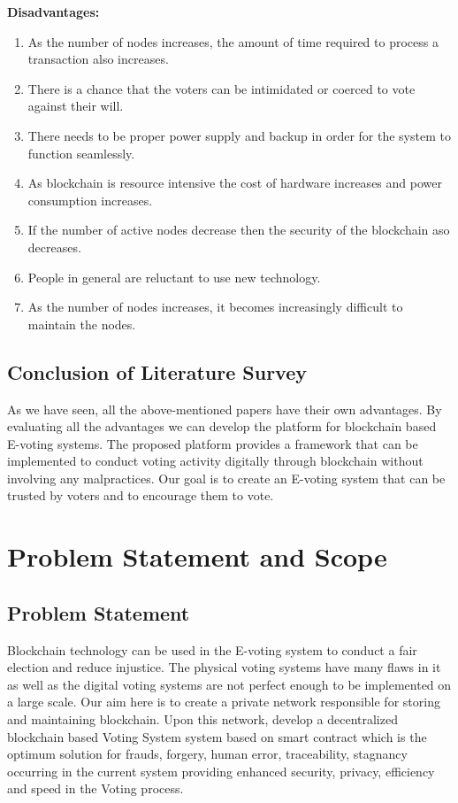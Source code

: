 \documentclass[oneside, 12pt]{book}
\begin{document}
			\textbf{Disadvantages:}
			\begin{enumerate}
				\item As the number of nodes increases, the amount of time required to process a transaction also increases.
				\item There is a chance that the voters can be intimidated or coerced to vote against their will.
				\item There needs to be proper power supply and backup in order for the system to function seamlessly.
				\item As blockchain is resource intensive the cost of hardware increases and power consumption increases.
				\item If the number of active nodes decrease then the security of the blockchain aso decreases.
				\item People in general are reluctant to use new technology.
				\item As the number of nodes increases, it becomes increasingly difficult to maintain the nodes.
			\end{enumerate}
		\subsection{Conclusion of Literature Survey}
			As we have seen, all the above-mentioned papers have their own advantages. By evaluating all the advantages we can develop the platform for blockchain based E-voting systems. The proposed platform provides a framework that can be implemented to conduct voting activity digitally through blockchain without involving any malpractices. Our goal is to create an E-voting system that can be trusted by voters and to encourage them to vote.
	\newpage
	\section{Problem Statement and Scope}
	\newpage
		\subsection{Problem Statement}
			Blockchain technology can be used in the E-voting system to conduct a fair election and reduce injustice. The physical voting systems have many flaws in it as well as the digital voting systems are not perfect enough to be implemented on a large scale. Our aim here is to create a private network responsible for storing and maintaining blockchain. Upon this network, develop a decentralized blockchain based Voting System system based on smart contract which is the optimum solution for frauds, forgery, human error, traceability, stagnancy occurring in the current system providing enhanced security, privacy, efficiency and speed in the Voting  process.
\end{document}
